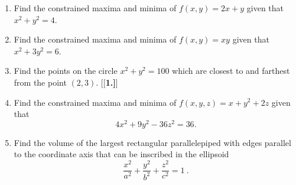 \startexercises\label{sec2dot7}
\begin{enumerate}[\bfseries 1.]
 \item Find the constrained maxima and minima of $f(x,y) = 2x+y$ given that $x^2 + y^2 =4$.
 \item Find the constrained maxima and minima of $f(x,y) = xy$ given that $x^2 + 3y^2 =6$.
 \item Find the points on the circle $x^2 + y^2 = 100$ which are closest to and farthest from the point $(2,3)$.
[{[\bfseries 1.]}]
 \item Find the constrained maxima and minima of $f(x,y,z) = x+y^2 +2z$ given that 
 \[4x^2 + 9y^2 -36z^2 =36.\]
 \item Find the volume of the largest rectangular parallelepiped with edges parallel to the coordinate axis that can be inscribed in the ellipsoid
  \begin{displaymath}
   \frac{x^2}{a^2} + \frac{y^2}{b^2} + \frac{z^2}{c^2} = 1 ~.
  \end{displaymath}
\end{enumerate}
